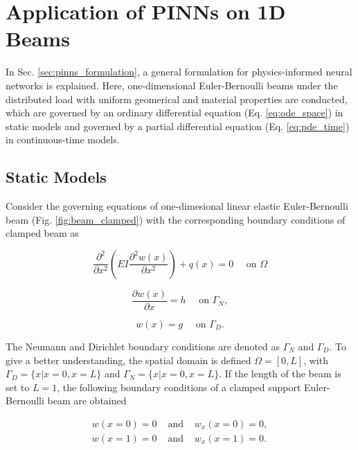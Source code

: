 \chapter{Application of PINNs on 1D Beams}
In Sec. \ref{sec:pinns_formulation}, a general formulation for physics-informed neural networks is explained. 
Here, one-dimensional Euler-Bernoulli beams under the distributed load with uniform geomerical and material properties
are conducted, which are governed by an ordinary differential equation (Eq. \ref{eq:ode_space}) in static models and 
governed by a partial differential equation (Eq. \ref{eq:pde_time}) in continuous-time models.   
\label{sec:third}

\section{Static Models}
Consider the governing equations of one-dimesional linear elastic Euler-Bernoulli 
beam (Fig. \ref{fig:beam_clamped}) with the corresponding boundary conditions of clamped beam as

\begin{equation}
    \label{eq:static_beam_1}
    \frac{\partial^{2}}{\partial x^{2}}\left(E I \frac{\partial^{2} w(x)}{\partial x^{2}}\right)+q(x)=0 \quad \text { on }\Omega
\end{equation}

\begin{equation}
    \label{eq:static_beam_2}
    \frac{\partial w(x)}{\partial x} = h \quad \text { on } \Gamma_{N},
\end{equation}

\begin{equation}
    \label{eq:static_beam_3}
    w(x) = g \quad \text { on } \Gamma_{D}.
\end{equation} 

\noindent The Neumann and Dirichlet boundary conditions are denoted as $\Gamma_{N}$ and $\Gamma_{D}$. To give a better understanding, 
the spatial domain is defined $\Omega=[0,L]$, with $\Gamma_{D}= \{x | x = 0, x = L\}$ and $\Gamma_{N}= \{x | x = 0, x = L\}$. 
If the length of the beam is set to $L=1$, the following boundary conditions 
of a clamped support Euler-Bernoulli beam are obtained

\begin{equation}
    \begin{aligned}
    \label{eq:static_beam_4}
    w(x=0)=0 & \text { and } & w_{x}(x=0)=0, \\
    w(x=1)=0 & \text { and } & w_{x}(x=1)=0.
    \end{aligned}
\end{equation}

